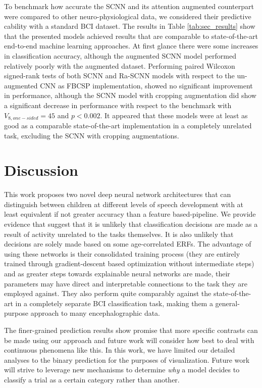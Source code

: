 \documentclass[fleqn,10pt]{wlscirep}
\begin{document}
To benchmark how accurate the SCNN and its attention augmented counterpart were compared to other neuro-physiological data, we considered their predictive cability with a standard BCI dataset. The results in Table \ref{tab:sec_results} show that the presented models achieved results that are comparable to state-of-the-art end-to-end machine learning approaches. At first glance there were some increases in classification accuracy, although the augmented SCNN model performed relatively poorly with the augmented dataset. Performing paired Wilcoxon signed-rank tests of both SCNN and Ra-SCNN models with respect to the un-augmented CNN as FBCSP implementation, showed no significant improvement in performance, although the SCNN model with cropping augmentation did show a significant decrease in performance with respect to the benchmark with $V_{8, one-sided}=45$ and $p<0.002$. It appeared that these models were at least as good as a comparable state-of-the-art implementation in a completely unrelated task, excluding the SCNN with cropping augmentations.


\section*{Discussion}

This work proposes two novel deep neural network architectures that can distinguish between children at different levels of speech development with at least equivalent if not greater accuracy than a feature based-pipeline. We provide evidence that suggest that it is unlikely that classification decisions are made as a result of activity unrelated to the tasks themselves. It is also unlikely that decisions are solely made based on some age-correlated ERFs. The advantage of using these networks is their consolidated training process (they are entirely trained through gradient-descent based optimization without intermediate steps) and as greater steps towards explainable neural networks are made, their parameters may have direct and interpretable connections to the task they are employed against. They also perform quite comparably against the state-of-the-art in a completely separate BCI classification task, making them a general-purpose approach to many encephalographic data.

The finer-grained prediction results show promise that more specific contrasts can be made using our approach and future work will consider how best to deal with continuous phenomena like this. In this work, we have limited our detailed analyses to the binary prediction for the purposes of visualization. Future work will strive to leverage new mechanisms to determine {\em why} a model decides to classify a trial as a certain category rather than another.
\end{document}
